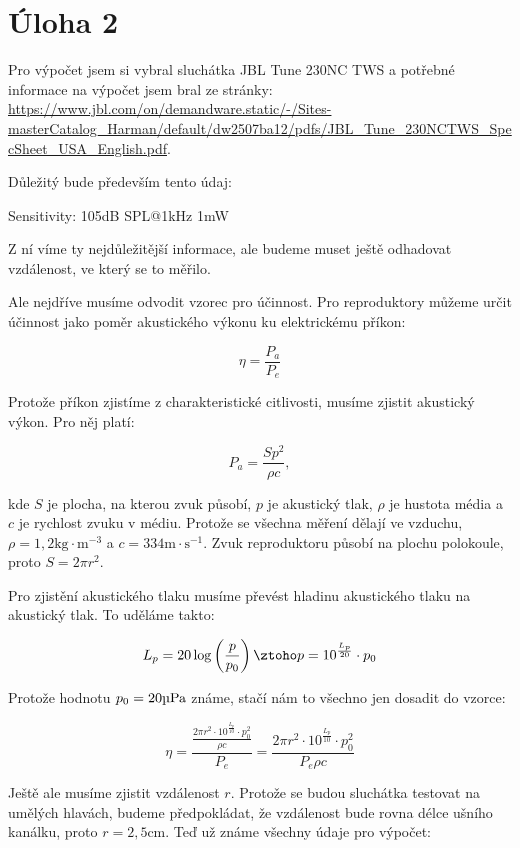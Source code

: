 \documentclass{fkssolpub}
\author{Ondřej Sedláček}
\begin{document}
 

\section{Úloha 2}

Pro výpočet jsem si vybral sluchátka JBL Tune 230NC TWS a potřebné informace
na výpočet jsem bral ze stránky: 
\url{https://www.jbl.com/on/demandware.static/-/Sites-masterCatalog_Harman/default/dw2507ba12/pdfs/JBL_Tune_230NCTWS_SpecSheet_USA_English.pdf}.

Důležitý bude především tento údaj:

\begin{displayquote}
Sensitivity: 105dB SPL@1kHz 1mW
\end{displayquote}

Z ní víme ty nejdůležitější informace, ale budeme muset ještě odhadovat
vzdálenost, ve který se to měřilo.

Ale nejdříve musíme odvodit vzorec pro účinnost. Pro reproduktory můžeme určit
účinnost jako poměr akustického výkonu ku elektrickému příkon:

\[
  \eta = \frac{P_a}{P_e}
\]

Protože příkon zjistíme z charakteristické citlivosti, musíme zjistit
akustický výkon. Pro něj platí:

\[
  P_a = \frac{S p^2}{\rho c},
\]

kde $S$ je plocha, na kterou zvuk působí, $p$ je akustický tlak, $\rho$ je
hustota média a $c$ je rychlost zvuku v médiu. Protože se všechna měření
dělají ve vzduchu, $\rho = 1,2 \text{kg} \cdot \text{m}^{-3}$ a
$c = 334 \text{m} \cdot \text{s}^{-1}$. Zvuk reproduktoru působí na plochu
polokoule, proto $S = 2 \pi r^2$.

Pro zjistění akustického tlaku musíme převést hladinu akustického
tlaku na akustický tlak. To uděláme takto:

\[
  L_p = 20 \log \left( \frac{p}{p_0} \right) \ztoho
    p = 10^{\frac{L_p}{20}} \cdot p_0
\]

Protože hodnotu $p_0 = 20 \text{\textmu Pa}$ známe, stačí nám to všechno jen
dosadit do vzorce:

\[
  \eta = \frac{\frac{2 \pi r^2 \cdot 10^{\frac{L_p}{10}} \cdot p_0^2}{\rho c}}{P_e} =
    \frac{2 \pi r^2 \cdot 10^{\frac{L_p}{10}} \cdot p_0^2}{P_e \rho c}
\]

Ještě ale musíme zjistit vzdálenost $r$. Protože se budou sluchátka testovat
na umělých hlavách, budeme předpokládat, že vzdálenost bude rovna délce
ušního kanálku, proto $r = 2,5 \text{cm}$. Teď už známe všechny údaje
pro výpočet:
\end{document}
